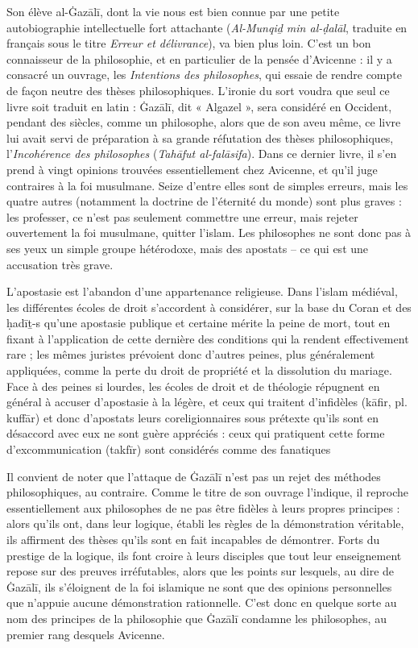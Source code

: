 Son élève al-Ġazālī, dont la vie nous est bien connue par une petite
autobiographie intellectuelle fort attachante (\emph{Al-Munqiḏ min
al-ḍalāl}, traduite en français sous le titre \emph{Erreur et
délivrance}), va bien plus loin. C'est un bon connaisseur de la
philosophie, et en particulier de la pensée d'Avicenne : il y a consacré
un ouvrage, les \emph{Intentions des philosophes}, qui essaie de rendre
compte de façon neutre des thèses philosophiques. L'ironie du sort
voudra que seul ce livre soit traduit en latin : Ġazālī, dit « Algazel
», sera considéré en Occident, pendant des siècles, comme un philosophe,
alors que de son aveu même, ce livre lui avait servi de préparation à sa
grande réfutation des thèses philosophiques, l'\emph{Incohérence des
philosophes} (\emph{Tahāfut al-falāsifa}). Dans ce dernier livre, il
s'en prend à vingt opinions trouvées essentiellement chez Avicenne, et
qu'il juge contraires à la foi musulmane. Seize d'entre elles sont de
simples erreurs, mais les quatre autres (notamment la doctrine de
l'éternité du monde) sont plus graves : les professer, ce n'est pas
seulement commettre une erreur, mais rejeter ouvertement la foi
musulmane, quitter l'islam. Les philosophes ne sont donc pas à ses yeux
un simple groupe hétérodoxe, mais des apostats -- ce qui est une
accusation très grave. 
\begin{Def}[apostasie]
L’apostasie est l’abandon d’une appartenance religieuse. Dans l’islam médiéval, les différentes écoles de droit s’accordent à considérer, sur la base du Coran et des ḥadīṯ-s qu’une apostasie publique et certaine mérite la peine de mort, tout en fixant à l’application de cette dernière des conditions qui la rendent effectivement rare ; les mêmes juristes prévoient donc d’autres peines, plus généralement appliquées, comme la perte du droit de propriété et la dissolution du mariage. Face à des peines si lourdes, les écoles de droit et de théologie répugnent en général à accuser d’apostasie à la légère, et ceux qui traitent d’infidèles (kāfir, pl. kuffār) et donc d’apostats leurs coreligionnaires sous prétexte qu’ils sont en désaccord avec eux ne sont guère appréciés : ceux qui pratiquent cette forme d’excommunication (takfīr) sont considérés comme des fanatiques 
\end{Def}

Il convient de noter que l'attaque de Ġazālī
n'est pas un rejet des méthodes philosophiques, au contraire. Comme le
titre de son ouvrage l'indique, il reproche essentiellement aux
philosophes de ne pas être fidèles à leurs propres principes : alors
qu'ils
ont, dans leur logique, établi les règles de la démonstration véritable,
ils affirment des thèses qu'ils sont en fait incapables de démontrer.
Forts du prestige de la logique, ils font croire à leurs disciples que
tout leur enseignement repose sur des preuves irréfutables, alors que
les points sur lesquels, au dire de Ġazālī, ils s'éloignent de la foi
islamique ne sont que des opinions personnelles que n'appuie aucune
démonstration rationnelle. C'est donc en quelque sorte au nom des
principes de la philosophie que Ġazālī condamne les philosophes, au
premier rang desquels Avicenne.

